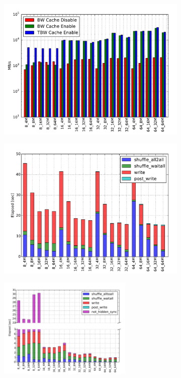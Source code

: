 \begin{figure}[]
  \centering
  \begin{subfigure}[]{0.7\textwidth}
  \centering
  \includegraphics[width=\textwidth]{figures/coll_perf_32GB_30sec_bw}
  \caption{}
  \label{figure: collperf-bw}
  \end{subfigure}
  \begin{subfigure}[]{0.7\textwidth}
  \centering
  \includegraphics[width=\textwidth]{figures/coll_perf_32GB_30sec_elapsed_disable}
  \caption{}
  \label{figure: collperf-elaps-disable}
  \end{subfigure}
  \begin{subfigure}[]{\textwidth}
  \centering
  \includegraphics[width=0.7\textwidth]{figures/coll_perf_32GB_30sec_elapsed_enable}

\end{subfigure}
\end{figure}
